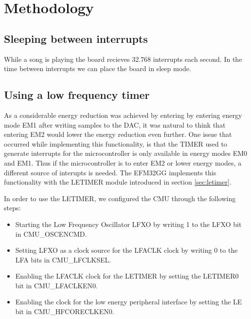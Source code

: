 \chapter{Methodology}


\section{Sleeping between interrupts}
While a song is playing the board recieves 32.768 interrupts each second. In the time between interrupts we can place the board in sleep mode.

\section{Using a low frequency timer}
As a considerable energy reduction was achieved by entering by entering energy mode EM1 after writing samples to the DAC, it was natural to think that entering EM2 would lower the energy reduction even further. One issue that occurred while implementing this functionality, is that the TIMER used to generate interrupts for the microcontroller is only available in energy modes EM0 and EM1. Thus if the microcontroller is to enter EM2 or lower energy modes, a different source of interupts is needed. The EFM32GG implements this functionality with the LETIMER module introduced in section \ref{sec:letimer}. 

In order to use the LETIMER, we configured the CMU through the following steps:
\begin{itemize}
  \item Starting the Low Frequency Oscillator LFXO by writing 1 to the LFXO bit in CMU\_OSCENCMD.
  \item Setting LFXO as a clock source for the LFACLK clock by writing 0 to the LFA bits in CMU\_LFCLKSEL.
  \item Enabling the LFACLK clock for the LETIMER by setting the LETIMER0 bit in CMU\_LFACLKEN0.
  \item Enabling the clock for the low energy peripheral interface by setting the LE bit in CMU\_HFCORECLKEN0.
\end{itemize}

